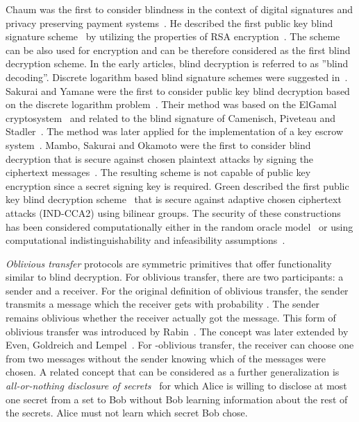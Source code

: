 \documentclass[10pt,journal]{IEEEtran}
\begin{document}
Chaum was the first to consider blindness in the context of digital signatures
and privacy preserving payment systems~\cite{Chaum_1983}. He described the
first public key blind signature scheme~\cite{Chaum_1985} by utilizing the properties of RSA encryption~\cite{Rivest_1978}.
The scheme can be also used for encryption and can be therefore considered as the first blind decryption scheme.
In the early articles, blind decryption is referred to as ''blind decoding''.
Discrete logarithm based blind signature schemes were suggested in~\cite{Chaum_1992,Okamoto_1992,Horster_1995,Camenisch_1995}.
Sakurai and Yamane were the first to consider public key
blind decryption based on the discrete logarithm problem~\cite{Sakurai_1996}.
Their method was based on the ElGamal cryptosystem~\cite{ElGamal_1985}
and related to the blind signature of Camenisch, Piveteau and Stadler~\cite{Camenisch_1995}. The method was later applied for
the implementation of a key escrow system~\cite{Sakurai_1998}.
Mambo, Sakurai and Okamoto were the first to consider blind decryption that is secure against chosen
plaintext attacks by signing the ciphertext messages~\cite{Mambo_1996}. The resulting scheme
is not capable of public key encryption since a secret signing key is required.
Green described the first public key blind decryption scheme~\cite{Green_2011} that is secure against
adaptive chosen ciphertext attacks (IND-CCA2) using bilinear groups.
The security of these constructions has been considered computationally
either in the random oracle model~\cite{Schnorr_2000} or using computational indistinguishability
and infeasibility assumptions~\cite{Green_2011}.

\emph{Oblivious transfer} protocols are symmetric primitives 
that offer functionality similar to blind decryption.
For oblivious transfer, there are two participants: a sender and
a receiver. For the original definition of oblivious transfer, the sender transmits a message which
the receiver gets with probability . The sender remains oblivious whether the receiver actually
got the message. This form of oblivious transfer was introduced by Rabin~\cite{Rabin_1981}. The 
concept was later extended by Even, Goldreich and Lempel~\cite{Even_1985}.
For -oblivious transfer, the receiver can choose one from two messages without the sender
knowing which of the messages were chosen.
A related concept that can be considered as a further generalization
is \emph{all-or-nothing disclosure of secrets}~\cite{Brassard_1987}
for which Alice is willing to disclose at most one secret from a set
to Bob without Bob learning information about the rest of the secrets. Alice must not learn which secret Bob chose.
\end{document}
